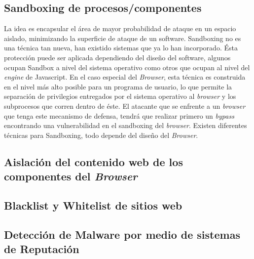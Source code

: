 \subsection{Sandboxing de procesos/componentes}
    \label{chap3:Sandboxing}
    La idea es encapsular el área de mayor probabilidad de ataque en un espacio aislado, minimizando la superficie de ataque de un software. Sandboxing no es una técnica tan nueva, han existido sistemas que ya lo han incorporado. Ésta protección puede ser aplicada dependiendo del diseño del software, algunos ocupan Sandbox a nivel del sistema operativo como otros que ocupan al nivel del \textit{engine} de Javascript. En el caso especial del \textit{Browser}, esta técnica es construida en el nivel más alto posible para un programa de usuario, lo que permite la separación de privilegios entregados por el sistema operativo al \textit{browser} y los subprocesos que corren dentro de éste. El atacante que se enfrente a un \textit{browser} que tenga este mecanismo de defensa, tendrá que realizar primero un \textit{bypass} encontrando una vulnerabilidad en el sandboxing del \textit{browser}. Existen diferentes técnicas para Sandboxing, todo depende del diseño del \textit{Browser}.


 \subsection{Aislación del contenido web de los componentes del \textit{Browser}}

 \subsection{Blacklist y Whitelist de sitios web}

 \subsection{Detección de Malware por medio de sistemas de Reputación}

